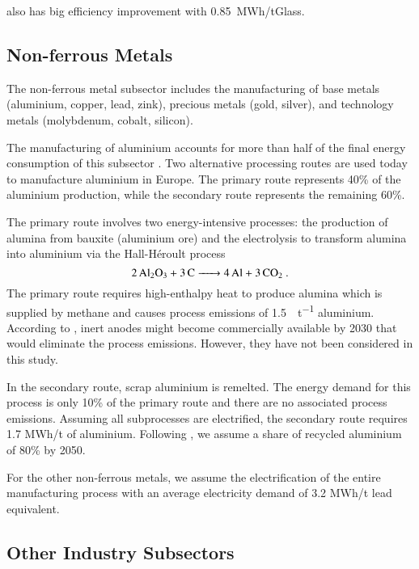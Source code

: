 
 also has big efficiency improvement with 0.85~MWh\el/tGlass.

\subsection{Non-ferrous Metals}
\label{sec:si:industry:nfm}

The non-ferrous metal subsector includes the manufacturing of base metals
(aluminium, copper, lead, zink), precious metals (gold, silver), and technology
metals (molybdenum, cobalt, silicon).

The manufacturing of aluminium accounts for more than half of the final energy
consumption of this subsector \citeS{}. Two alternative processing routes are
used today to manufacture aluminium in Europe. The primary route represents 40\%
of the aluminium production, while the secondary route represents the remaining
60\%.

The primary route involves two energy-intensive processes: the production of
alumina from bauxite (aluminium ore) and the electrolysis to transform alumina
into aluminium via the  Hall-H\'{e}roult process
\begin{equation}
    \ce{2Al2O3 + 3C -> 4Al + 3\co}.
\end{equation}
The primary route requires high-enthalpy heat  to produce
alumina which is supplied by methane and causes process emissions of
\SI{1.5}{\tco\per\tonne} aluminium. According to  ,
inert anodes might become commercially available by 2030 that would eliminate
the process emissions. However, they have not been considered in this study.

In the secondary route, scrap aluminium is remelted. The energy demand for this
process is only 10\% of the primary route and there are no associated process
emissions. Assuming all subprocesses are electrified, the secondary route
requires 1.7 MWh/t of aluminium. Following , we assume
a share of recycled aluminium of 80\% by 2050.

For the other non-ferrous metals, we assume the electrification of the entire
manufacturing process with an average electricity demand of 3.2 MWh/t lead
equivalent. 

\subsection{Other Industry Subsectors}
\label{sec:si:industry:other}

